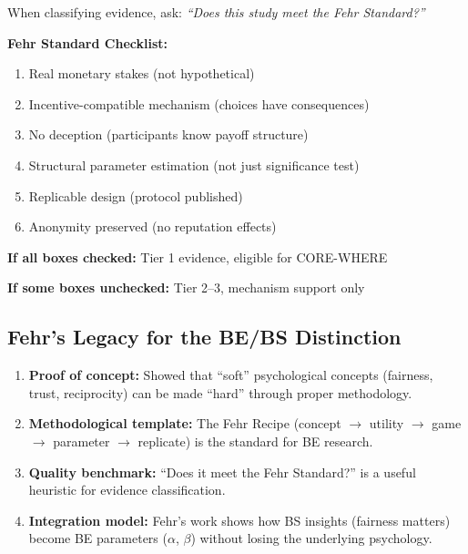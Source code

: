 \documentclass[11pt, a4paper]{article}
\begin{document}
\begin{tcolorbox}[colback=yellow!5!white, colframe=yellow!75!black,
    title=The Fehr Test for Tier 1 Evidence]

When classifying evidence, ask: \textit{``Does this study meet the Fehr Standard?''}

\textbf{Fehr Standard Checklist:}
\begin{enumerate}[nosep]
    \item[$\square$] Real monetary stakes (not hypothetical)
    \item[$\square$] Incentive-compatible mechanism (choices have consequences)
    \item[$\square$] No deception (participants know payoff structure)
    \item[$\square$] Structural parameter estimation (not just significance test)
    \item[$\square$] Replicable design (protocol published)
    \item[$\square$] Anonymity preserved (no reputation effects)
\end{enumerate}

\textbf{If all boxes checked:} Tier 1 evidence, eligible for CORE-WHERE

\textbf{If some boxes unchecked:} Tier 2--3, mechanism support only

\end{tcolorbox}

\subsection{Fehr's Legacy for the BE/BS Distinction}

\begin{enumerate}
\item \textbf{Proof of concept:} Showed that ``soft'' psychological concepts (fairness, trust, reciprocity) can be made ``hard'' through proper methodology.

\item \textbf{Methodological template:} The Fehr Recipe (concept $\to$ utility $\to$ game $\to$ parameter $\to$ replicate) is the standard for BE research.

\item \textbf{Quality benchmark:} ``Does it meet the Fehr Standard?'' is a useful heuristic for evidence classification.

\item \textbf{Integration model:} Fehr's work shows how BS insights (fairness matters) become BE parameters ($\alpha$, $\beta$) without losing the underlying psychology.
\end{enumerate}
\end{document}
